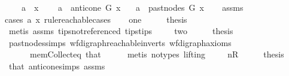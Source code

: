 \begin{isabellebody}
\ \ \ \ {\isachardoublequoteopen}a\ {\isacharequal}{\kern0pt}\ x{\isachardoublequoteclose}\ \isanewline
\ \ {\isacharbar}{\kern0pt}\ {\isachardoublequoteopen}a\ {\isasymin}\ anticone\ G\ x{\isachardoublequoteclose}\isanewline
\ \ {\isacharbar}{\kern0pt}\ {\isachardoublequoteopen}a\ {\isasymin}\ past{\isacharunderscore}{\kern0pt}nodes\ G\ x{\isachardoublequoteclose}\isanewline
%
\isadelimproof
\ \ %
\endisadelimproof
%
\isatagproof
{}\isamarkupfalse%
\ assms\isanewline
{}\isamarkupfalse%
{\isacharparenleft}{\kern0pt}cases\ a\ x\ rule{\isacharcolon}{\kern0pt}reachable{}{\isacharunderscore}{\kern0pt}cases{\isacharparenright}{\kern0pt}\isanewline
\ \ \isamarkupfalse%
\ one\isanewline
\ \ \isamarkupfalse%
\ \isamarkupfalse%
\ {\isacharquery}{\kern0pt}thesis\isanewline
\ \ \ \ \isamarkupfalse%
\ {\isacharparenleft}{\kern0pt}metis\ assms{\isacharparenleft}{\kern0pt}{}{\isacharparenright}{\kern0pt}\ tips{\isacharunderscore}{\kern0pt}not{\isacharunderscore}{\kern0pt}referenced\ tips{\isacharunderscore}{\kern0pt}tips{\isacharparenright}{\kern0pt}\ \isanewline
{}\isamarkupfalse%
\isanewline
\ \ \isamarkupfalse%
\ two\isanewline
\ \ \isamarkupfalse%
\ \isamarkupfalse%
\ {\isacharquery}{\kern0pt}thesis\ \isamarkupfalse%
\ past{\isacharunderscore}{\kern0pt}nodes{\isachardot}{\kern0pt}simps\ wf{\isacharunderscore}{\kern0pt}digraph{\isachardot}{\kern0pt}reachable{}{\isacharunderscore}{\kern0pt}in{\isacharunderscore}{\kern0pt}verts{\isacharparenleft}{\kern0pt}{}{\isacharparenright}{\kern0pt}\ wf{\isacharunderscore}{\kern0pt}digraph{\isacharunderscore}{\kern0pt}axioms\isanewline
\ \ \ \ \ \ mem{\isacharunderscore}{\kern0pt}Collect{\isacharunderscore}{\kern0pt}eq\ that{\isacharparenleft}{\kern0pt}{}{\isacharparenright}{\kern0pt}\isanewline
\ \ \ \ \isamarkupfalse%
\ {\isacharparenleft}{\kern0pt}metis\ {\isacharparenleft}{\kern0pt}no{\isacharunderscore}{\kern0pt}types{\isacharcomma}{\kern0pt}\ lifting{\isacharparenright}{\kern0pt}{\isacharparenright}{\kern0pt}\ \isanewline
{}\isamarkupfalse%
\isanewline
\ \ \isamarkupfalse%
\ nR\isanewline
\ \ \isamarkupfalse%
\ \isamarkupfalse%
\ {\isacharquery}{\kern0pt}thesis\ \isamarkupfalse%
\ that{\isacharparenleft}{\kern0pt}{}{\isacharparenright}{\kern0pt}\ anticone{\isachardot}{\kern0pt}simps\ assms\ \isamarkupfalse%

\end{isabellebody}
